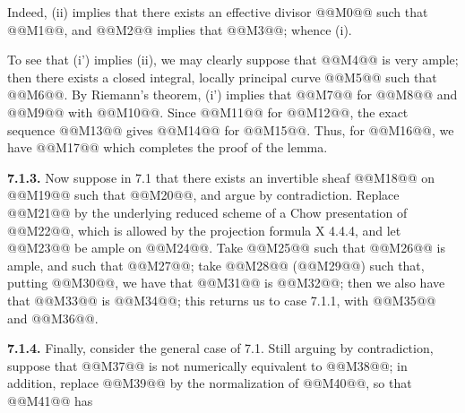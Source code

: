 Indeed, (ii) implies that there exists an effective divisor @@M0@@ such that @@M1@@, and @@M2@@ implies that @@M3@@; whence (i).

To see that (i') implies (ii), we may clearly suppose that @@M4@@ is very ample; then there exists a closed integral, locally principal curve @@M5@@ such that @@M6@@. By Riemann's theorem, (i') implies that @@M7@@ for @@M8@@ and @@M9@@ with @@M10@@. Since @@M11@@ for @@M12@@, the exact sequence
@@M13@@
gives @@M14@@ for @@M15@@. Thus, for @@M16@@, we have
@@M17@@
which completes the proof of the lemma.

\textbf{7.1.3.} Now suppose in 7.1 that there exists an invertible sheaf @@M18@@ on @@M19@@ such that @@M20@@, and argue by contradiction. Replace @@M21@@ by the underlying reduced scheme of a Chow presentation of @@M22@@, which is allowed by the projection formula X 4.4.4, and let @@M23@@ be ample on @@M24@@. Take @@M25@@ such that @@M26@@ is ample, and such that @@M27@@; take @@M28@@ (@@M29@@) such that, putting @@M30@@, we have that @@M31@@ is @@M32@@; then we also have that @@M33@@ is @@M34@@; this returns us to case 7.1.1, with @@M35@@ and @@M36@@.

\textbf{7.1.4.} Finally, consider the general case of 7.1. Still arguing by contradiction, suppose that @@M37@@ is not numerically equivalent to @@M38@@; in addition, replace @@M39@@ by the normalization of @@M40@@, so that @@M41@@ has
